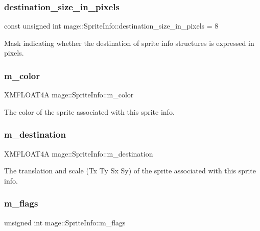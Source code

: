 \subsubsection{\texorpdfstring{destination\+\_\+size\+\_\+in\+\_\+pixels}{destination\_size\_in\_pixels}}
{\footnotesize\ttfamily const unsigned int mage\+::\+Sprite\+Info\+::destination\+\_\+size\+\_\+in\+\_\+pixels = 8\hspace{0.3cm}{\ttfamily [static]}}

Mask indicating whether the destination of sprite info structures is expressed in pixels. \hypertarget{structmage_1_1_sprite_info_ab76316069522fc10f9580b705406ed16}{}\label{structmage_1_1_sprite_info_ab76316069522fc10f9580b705406ed16} 
\subsubsection{\texorpdfstring{m\+\_\+color}{m\_color}}
{\footnotesize\ttfamily X\+M\+F\+L\+O\+A\+T4A mage\+::\+Sprite\+Info\+::m\+\_\+color}

The color of the sprite associated with this sprite info. \hypertarget{structmage_1_1_sprite_info_a40a00e6cf76fc333309d706f064deed8}{}\label{structmage_1_1_sprite_info_a40a00e6cf76fc333309d706f064deed8} 
\subsubsection{\texorpdfstring{m\+\_\+destination}{m\_destination}}
{\footnotesize\ttfamily X\+M\+F\+L\+O\+A\+T4A mage\+::\+Sprite\+Info\+::m\+\_\+destination}

The translation and scale (Tx Ty Sx Sy) of the sprite associated with this sprite info. \hypertarget{structmage_1_1_sprite_info_a1143e535cb1880ab9d931ab5b2dfcd5e}{}\label{structmage_1_1_sprite_info_a1143e535cb1880ab9d931ab5b2dfcd5e} 
\subsubsection{\texorpdfstring{m\+\_\+flags}{m\_flags}}
{\footnotesize\ttfamily unsigned int mage\+::\+Sprite\+Info\+::m\+\_\+flags}

